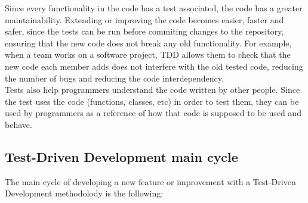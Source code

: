 Since every functionality in the code has a test associated, the code has a greater maintainability. Extending or improving the code becomes easier, faster and safer, since the tests can be run before commiting changes to the repository, ensuring that the new code does not break any old functionality. For example, when a team works on a software project, TDD allows them to check that the new code each member adds does not interfere with the old tested code, reducing the number of bugs and reducing the code interdependency.\\

Tests also help programmers understand the code written by other people. Since the test uses the code (functions, classes, etc) in order to test them, they can be used by programmers as a reference of how that code is supposed to be used and behave.\\

\subsection{Test-Driven Development main cycle}
\label{software_TDD_maincycle}

The main cycle of developing a new feature or improvement with a Test-Driven Development methodolody is the following:

